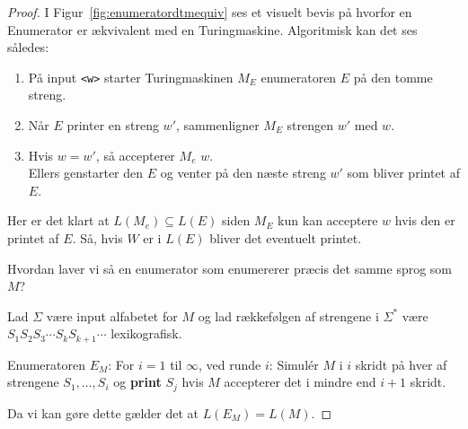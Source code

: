 \begin{proof}

	I Figur~\ref{fig:enumeratordtmequiv} ses et visuelt bevis på hvorfor en Enumerator er ækvivalent med en Turingmaskine. Algoritmisk kan det ses således:
	\begin{enumerate}
		\item På input \texttt{<w>} starter Turingmaskinen $M_{E}$ enumeratoren $E$ på den tomme streng.
		\item Når $E$ printer en streng $w'$, sammenligner $M_{E}$  strengen $w'$ med $w$.
		\item Hvis $w = w'$, så accepterer $M_{e}$ $w$. \\ \noindent Ellers genstarter den $E$ og venter på den næste streng $w'$ som bliver printet af $E$.
	\end{enumerate}
	Her er det klart at $L(M_{e}) \subseteq L(E)$ siden $M_{E}$  kun kan acceptere $w$ hvis den er printet af $E$. Så, hvis $W$ er i $L(E)$ bliver det eventuelt printet.

	Hvordan laver vi så en enumerator som enumererer præcis det samme sprog som $M$?

	Lad $\Sigma$ være input alfabetet for $M$ og lad rækkefølgen af strengene i $\Sigma^{*}$ være $S_{1}S_{2}S_{3} \cdots S_{k}S_{k+1} \cdots$ lexikografisk.

	Enumeratoren $E_{M}$: For $i = 1$ til $\infty$, ved runde $i$: Simulér $M$  i $i$ skridt på hver af strengene $S_{1}, \ldots, S_{i}$ og \textbf{print} $S_{j}$ hvis $M$ accepterer det i mindre end $i+1$ skridt.

	Da vi kan gøre dette gælder det at $L(E_{M}) = L(M)$.
\end{proof}

